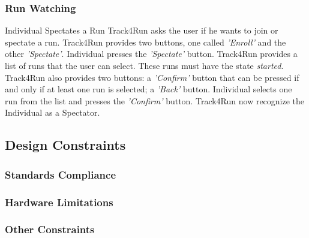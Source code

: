 \documentclass[a4paper]{article}
\begin{document}
        \subsubsection{Run Watching}
        
        \begin{usecase}{Individual Spectates a Run}
              {Track4Run asks the user if he wants to join or spectate a run. Track4Run provides two buttons, one called \textit{'Enroll'} and the other \textit{'Spectate'}.}
              {Individual presses the \textit{'Spectate'} button.}
              {Track4Run provides a list of runs that the user can select. These runs must have the state \textit{started}. Track4Run also provides two buttons: a \textit{'Confirm'} button that can be pressed if and only if at least one run is selected; a \textit{'Back'} button.}
              {Individual selects one run from the list and presses the \textit{'Confirm'} button.}
              {Track4Run now recognize the Individual as a Spectator.}
        \end{usecase}
    
    \subsection{Design Constraints}
    
        \subsubsection{Standards Compliance}
        
        \subsubsection{Hardware Limitations}
        
        \subsubsection{Other Constraints}
    
\end{document}
